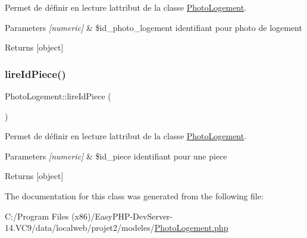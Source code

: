 Permet de définir en lecture l\textquotesingle{}attribut de la classe \hyperlink{class_photo_logement}{Photo\+Logement}. 


\begin{DoxyParams}{Parameters}
{\em \mbox{[}numeric\mbox{]}} & \$id\+\_\+photo\+\_\+logement identifiant pour photo de logement \\
\hline
\end{DoxyParams}
\begin{DoxyReturn}{Returns}
\mbox{[}object\mbox{]} 
\end{DoxyReturn}
\mbox{\label{class_photo_logement_a7681440c228210689b2bcc599c44f025}} 
\subsubsection{\texorpdfstring{lire\+Id\+Piece()}{lireIdPiece()}}
{\footnotesize\ttfamily Photo\+Logement\+::lire\+Id\+Piece (\begin{DoxyParamCaption}{ }\end{DoxyParamCaption})}



Permet de définir en lecture l\textquotesingle{}attribut de la classe \hyperlink{class_photo_logement}{Photo\+Logement}. 


\begin{DoxyParams}{Parameters}
{\em \mbox{[}numeric\mbox{]}} & \$id\+\_\+piece identifiant pour une piece \\
\hline
\end{DoxyParams}
\begin{DoxyReturn}{Returns}
\mbox{[}object\mbox{]} 
\end{DoxyReturn}


The documentation for this class was generated from the following file\+:\begin{DoxyCompactItemize}
\item 
C\+:/\+Program Files (x86)/\+Easy\+P\+H\+P-\/\+Dev\+Server-\/14.\+V\+C9/data/localweb/projet2/modeles/\hyperlink{_photo_logement_8php}{Photo\+Logement.\+php}\end{DoxyCompactItemize}
